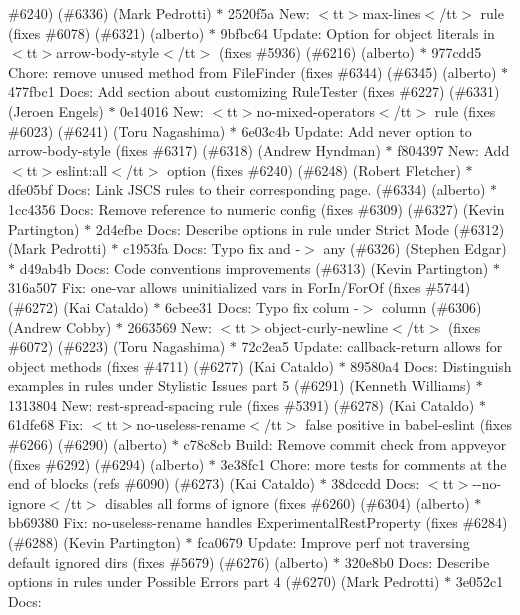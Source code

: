 \begin{DoxyItemize}
\#6240) (\#6336) (\+Mark Pedrotti) \texorpdfstring{$\ast$}{*} 2520f5a New\+: $<$tt$>$max-\/lines$<$/tt$>$ rule (fixes \#6078) (\#6321) (alberto) \texorpdfstring{$\ast$}{*} 9bfbc64 Update\+: Option for object literals in $<$tt$>$arrow-\/body-\/style$<$/tt$>$ (fixes \#5936) (\#6216) (alberto) \texorpdfstring{$\ast$}{*} 977cdd5 Chore\+: remove unused method from File\+Finder (fixes \#6344) (\#6345) (alberto) \texorpdfstring{$\ast$}{*} 477fbc1 Docs\+: Add section about customizing Rule\+Tester (fixes \#6227) (\#6331) (\+Jeroen Engels) \texorpdfstring{$\ast$}{*} 0e14016 New\+: $<$tt$>$no-\/mixed-\/operators$<$/tt$>$ rule (fixes \#6023) (\#6241) (\+Toru Nagashima) \texorpdfstring{$\ast$}{*} 6e03c4b Update\+: Add never option to arrow-\/body-\/style (fixes \#6317) (\#6318) (\+Andrew Hyndman) \texorpdfstring{$\ast$}{*} f804397 New\+: Add $<$tt$>$eslint\+:all$<$/tt$>$ option (fixes \#6240) (\#6248) (\+Robert Fletcher) \texorpdfstring{$\ast$}{*} dfe05bf Docs\+: Link JSCS rules to their corresponding page. (\#6334) (alberto) \texorpdfstring{$\ast$}{*} 1cc4356 Docs\+: Remove reference to numeric config (fixes \#6309) (\#6327) (\+Kevin Partington) \texorpdfstring{$\ast$}{*} 2d4efbe Docs\+: Describe options in rule under Strict Mode (\#6312) (\+Mark Pedrotti) \texorpdfstring{$\ast$}{*} c1953fa Docs\+: Typo fix \textquotesingle{}and\textquotesingle{} -\/$>$ \textquotesingle{}any\textquotesingle{} (\#6326) (\+Stephen Edgar) \texorpdfstring{$\ast$}{*} d49ab4b Docs\+: Code conventions improvements (\#6313) (\+Kevin Partington) \texorpdfstring{$\ast$}{*} 316a507 Fix\+: one-\/var allows uninitialized vars in For\+In/\+For\+Of (fixes \#5744) (\#6272) (\+Kai Cataldo) \texorpdfstring{$\ast$}{*} 6cbee31 Docs\+: Typo fix \textquotesingle{}colum\textquotesingle{} -\/$>$ \textquotesingle{}column\textquotesingle{} (\#6306) (\+Andrew Cobby) \texorpdfstring{$\ast$}{*} 2663569 New\+: $<$tt$>$object-\/curly-\/newline$<$/tt$>$ (fixes \#6072) (\#6223) (\+Toru Nagashima) \texorpdfstring{$\ast$}{*} 72c2ea5 Update\+: callback-\/return allows for object methods (fixes \#4711) (\#6277) (\+Kai Cataldo) \texorpdfstring{$\ast$}{*} 89580a4 Docs\+: Distinguish examples in rules under Stylistic Issues part 5 (\#6291) (\+Kenneth Williams) \texorpdfstring{$\ast$}{*} 1313804 New\+: rest-\/spread-\/spacing rule (fixes \#5391) (\#6278) (\+Kai Cataldo) \texorpdfstring{$\ast$}{*} 61dfe68 Fix\+: $<$tt$>$no-\/useless-\/rename$<$/tt$>$ false positive in babel-\/eslint (fixes \#6266) (\#6290) (alberto) \texorpdfstring{$\ast$}{*} c78c8cb Build\+: Remove commit check from appveyor (fixes \#6292) (\#6294) (alberto) \texorpdfstring{$\ast$}{*} 3e38fc1 Chore\+: more tests for comments at the end of blocks (refs \#6090) (\#6273) (\+Kai Cataldo) \texorpdfstring{$\ast$}{*} 38dccdd Docs\+: $<$tt$>$-\/-\/no-\/ignore$<$/tt$>$ disables all forms of ignore (fixes \#6260) (\#6304) (alberto) \texorpdfstring{$\ast$}{*} bb69380 Fix\+: no-\/useless-\/rename handles Experimental\+Rest\+Property (fixes \#6284) (\#6288) (\+Kevin Partington) \texorpdfstring{$\ast$}{*} fca0679 Update\+: Improve perf not traversing default ignored dirs (fixes \#5679) (\#6276) (alberto) \texorpdfstring{$\ast$}{*} 320e8b0 Docs\+: Describe options in rules under Possible Errors part 4 (\#6270) (\+Mark Pedrotti) \texorpdfstring{$\ast$}{*} 3e052c1 Docs\+: 
\end{DoxyItemize}
